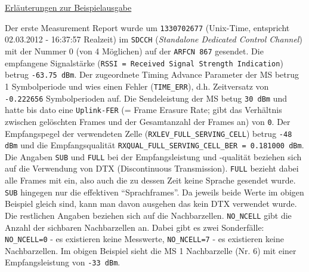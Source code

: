\underline{Erläuterungen zur Beispielausgabe}

Der erste Measurement Report wurde um \verb|1330702677| (Unix-Time, entspricht 02.03.2012 - 16:37:57 Realzeit) im \verb|SDCCH| (\textit{Standalone Dedicated Control Channel}) mit der Nummer 0 (von 4 Möglichen) auf der \verb|ARFCN 867| gesendet. Die empfangene Signalstärke (\verb|RSSI = Received Signal Strength Indication|) betrug \verb|-63.75 dBm|. Der zugeordnete Timing Advance Parameter der MS betrug 1 Symbolperiode und wies einen Fehler (\verb|TIME_ERR|), d.h. Zeitversatz von \verb|-0.222656| Symbolperioden auf. Die Sendeleistung der MS betug \verb|30 dBm| und hatte bis dato eine \verb|Uplink-FER| (= Frame Erasure Rate; gibt das Verhältnis zwischen gelöschten Frames und der Gesamtanzahl der Frames an) von \verb|0|. Der Empfangspegel der verwendeten Zelle (\verb|RXLEV_FULL_SERVING_CELL|) betrug \verb|-48 dBm| und die Empfangsqualität \verb|RXQUAL_FULL_SERVING_CELL_BER = 0.181000 dBm|. Die Angaben \verb|SUB| und \verb|FULL| bei der Empfangsleistung und -qualität beziehen sich auf die Verwendung von DTX (Discontinuous Transmission). \verb|FULL| bezieht dabei alle Frames mit ein, also auch die zu dessen Zeit keine Sprache gesendet wurde. \verb|SUB| hingegen nur die effektiven "`Sprachframes"'. Da jeweils beide Werte im obigen Beispiel gleich sind, kann man davon ausgehen das kein DTX verwendet wurde. Die restlichen Angaben beziehen sich auf die Nachbarzellen. \verb|NO_NCELL| gibt die Anzahl der sichbaren Nachbarzellen an. Dabei gibt es zwei Sonderfälle: \verb|NO_NCELL=0| - es existieren keine Messwerte, \verb|NO_NCELL=7| - es existieren keine Nachbarzellen. Im obigen Beispiel sieht die MS 1 Nachbarzelle (Nr. 6) mit einer Empfangsleistung von \verb|-33 dBm|. 
